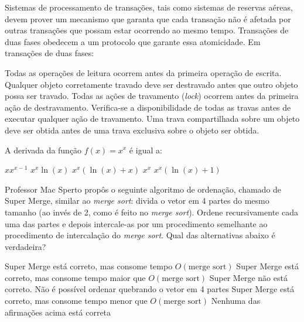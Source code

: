 \documentclass[12pt, addpoints]{exam}
\begin{document}
    \begin{questions}

    \newpage
    \question

Sistemas de processamento de transações, tais como sistemas de reservas aéreas, devem prover um mecanismo que garanta que cada transação não é afetada por outras transações que possam estar ocorrendo ao mesmo tempo. Transações de duas fases obedecem a um protocolo que garante essa atomicidade. Em transações de duas fases:


\begin{choices}
\choice Todas as operações de leitura ocorrem antes da primeira operação de escrita.
\choice Qualquer objeto corretamente travado deve ser destravado antes que outro objeto possa ser travado.
\choice Todas as ações de travamento (\textit{lock}) ocorrem antes da primeira ação de destravamento.
\choice Verifica-se a disponibilidade de todas as travas antes de executar qualquer ação de travamento.
\choice Uma trava compartilhada sobre um objeto deve ser obtida antes de uma trava exclusiva sobre o objeto ser obtida.
\end{choices}

\question

A derivada da função \( f(x) = x^x \) é igual a:
\begin{choices}
\choice \( x x^{x-1} \)
\choice \( x^x \ln(x) \)
\choice \( x^x (\ln(x) + x) \)
\choice \( x^x \)
\choice \( x^x (\ln(x) + 1) \)
\end{choices}

\question

Professor Mac Sperto propôs o seguinte algoritmo de ordenação, chamado de Super Merge, similar ao \textit{merge sort}: divida o vetor em 4 partes do mesmo tamanho (ao invés de 2, como é feito no \textit{merge sort}). Ordene recursivamente cada uma das partes e depois intercale-as por um procedimento semelhante ao procedimento de intercalação do \textit{merge sort}. Qual das alternativas abaixo é verdadeira?
\begin{choices}
\choice Super Merge está correto, mas consome tempo \( O(\text{merge sort}) \)
\choice Super Merge está correto, mas consome tempo maior que \( O(\text{merge sort}) \)
\choice Super Merge não está correto. Não é possível ordenar quebrando o vetor em 4 partes
\choice Super Merge está correto, mas consome tempo menor que \( O(\text{merge sort}) \)
\choice Nenhuma das afirmações acima está correta
\end{choices}


\end{questions}
\end{document}
